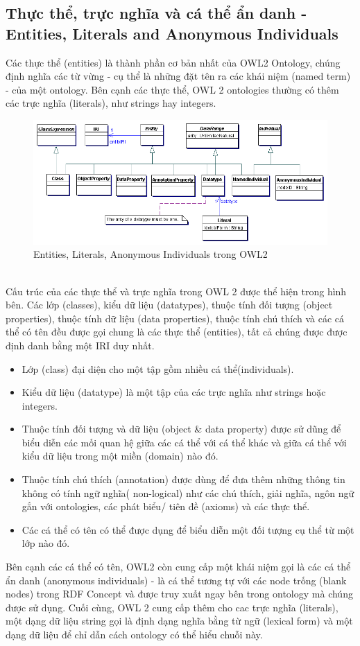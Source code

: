 \subsection{Thực thể, trực nghĩa và cá thể ẩn danh - Entities, Literals and Anonymous Individuals}
Các thực thể (entities) là thành phần cơ bản nhất của OWL2 Ontology, chúng định nghĩa các từ vừng - cụ thể là những đặt tên ra các khái niệm (named term) - của một ontology. Bên cạnh các thực thể, OWL 2 ontologies thường có thêm các trực nghĩa (literals), như strings hay integers.
\begin{figure}[ht!]
	\centering
	\includegraphics[width=140mm]{Figures/entities.png}
	\caption{Entities, Literals, Anonymous Individuals trong OWL2 \label{overflow}}
\end{figure}
\\
Cấu trúc của các thực thể và trực nghĩa trong OWL 2 được thể hiện trong hình bên. Các lớp (classes), kiểu dữ liệu (datatypes), thuộc tính đối tượng (object properties), thuộc tính dữ liệu (data properties), thuộc tính chú thích và các cá thể có tên đều được gọi chung là các thực thể (entities), tất cả chúng được được định danh bằng một IRI duy nhất. 
\begin{itemize}
\item Lớp (class) đại diện cho một tập gồm nhiều cá thể(individuals).
\item Kiểu dữ liệu (datatype) là một tập của các trực nghĩa như strings hoặc integers.
\item Thuộc tính đối tượng và dữ liệu (object \& data property) được sử dũng để biểu diễn các mối quan hệ giữa các cá thể với cá thể khác và giữa cá thể với kiểu dữ liệu trong một miền (domain) nào đó.
\item Thuộc tính chú thích (annotation) được dùng để đưa thêm những thông tin không có tính ngữ nghĩa( non-logical) như các chú thích, giải nghĩa, ngôn ngữ gắn với ontologies, các phát biểu/ tiên đề (axioms) và các thực thể.
\item  Các cá thể có tên có thể được dụng để biểu diễn một đối tượng cụ thể từ một lớp nào đó.
\end{itemize}
Bên cạnh các cá thể có tên, OWL2 còn cung cấp một khái niệm gọi là các cá thể ẩn danh (anonymous individuals) - là cá thể tương tự với các node trống (blank nodes) trong RDF Concept \cite{rdf_concept} và được truy xuất ngay bên trong ontology mà chúng được sử dụng. Cuối cùng, OWL 2 cung cấp thêm cho cac trực nghĩa (literals), một dạng dữ liệu string gọi là định dạng nghĩa bằng từ ngữ (lexical form) và một dạng dữ liệu để chỉ dẫn cách ontology có thể hiểu chuỗi này.
